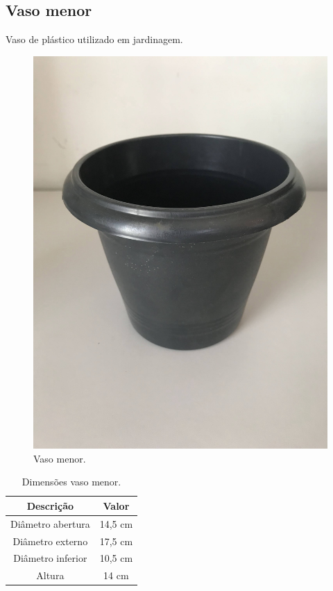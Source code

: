 \documentclass[
	12pt,				%
	openright,			%
	oneside,			%
	a4paper,			%
	chapter=TITLE,		%
	english,			%
	brazil				%
	]{abntex2}
\begin{document}
\subsection{Vaso menor}

Vaso de plástico utilizado em jardinagem.

\begin{multicols}{2}
\begin{figure}[H]
    \centering
    \includegraphics[scale=0.04, angle=-90]{imagens/IMG_0600.jpg}
    \caption{Vaso menor.}
    \label{fig:vasomenor}
\end{figure}

\begin{table}[H]
    \centering
    \caption{Dimensões vaso menor.}
    \label{tab:vasomenor} 
    \begin{tabular}{ |c|c| }                           
        \hline
        \rowcolor{lightgray} \textbf{Descrição} & \textbf{Valor}\\
        \hline
        Diâmetro abertura & 14,5 cm \\
        \hline
        Diâmetro externo & 17,5 cm \\
        \hline
        Diâmetro inferior & 10,5 cm \\
        \hline
        Altura & 14 cm \\
        \hline
    \end{tabular}  
\end{table}  
\end{multicols}
\end{document}
